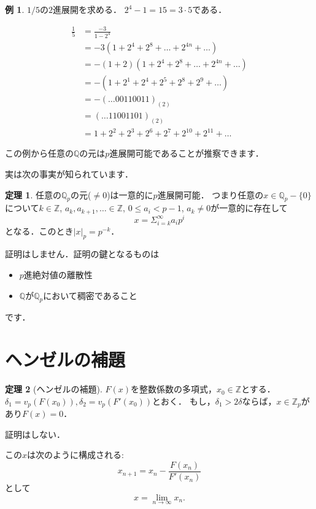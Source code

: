\documentclass[uplatex]{jsarticle}
\newcommand{\Z}{\mathbb{Z}}
\newcommand{\Q}{\mathbb{Q}}
\theoremstyle{definition} %
\newtheorem{thm}{定理}
\newtheorem*{example*}{例}
\begin{document}
\begin{example*}
$1/5$の$2$進展開を求める．
$2^4-1 = 15 = 3 \cdot 5$である．

\begin{align*}
\frac{1}{5} &= \frac{-3}{1-2^4} \\
&= -3 (1 + 2^4 + 2^8 + \dots+ 2^{4n} + \dots) \\
&= -(1+2) (1 + 2^4 + 2^8 + \dots+ 2^{4n} + \dots) \\
&= -(1 + 2^1 + 2^4 + 2^5 + 2^8 + 2^9 + \dots) \\
&= -(\dots 00110011)_{(2)} \\
&= (\dots 11001101)_{(2)} \\
&= 1 + 2^2 + 2^3 + 2^6 + 2^7 + 2^{10} + 2^{11} + \dots
\end{align*}
\end{example*}

この例から任意の$\Q$の元は$p$進展開可能であることが推察できます．

実は次の事実が知られています．
\begin{oframed}\begin{thm}
任意の$\Q_p$の元($\ne 0$)は一意的に$p$進展開可能．
つまり任意の$x \in \Q_p- \{0\}$について$k \in \Z$, $a_k, a_{k+1}, \dots \in \Z$, $0 \le a_i < p-1$, $a_k \ne 0$が一意的に存在して
\[x = \Sigma_{i=k}^\infty a_i p^i\]
となる．このとき$|x|_p = p^{-k}$．
\end{thm}\end{oframed}
証明はしません．証明の鍵となるものは
\begin{itemize}
\item $p$進絶対値の離散性
\item $\Q$が$\Q_p$において稠密であること
\end{itemize}
です．

\section{ヘンゼルの補題}

\begin{oframed}\begin{thm}[ヘンゼルの補題]
$F(x)$を整数係数の多項式，$x_0 \in \Z$とする．
$\delta_1 = v_p(F(x_0)), \delta_2 = v_p(F'(x_0))$とおく．
もし，$\delta_1 > 2 \delta$ならば，$x \in \Z_p$があり$F(x)=0$．
\end{thm}\end{oframed}
証明はしない．

この$x$は次のように構成される:
\[x_{n+1} = x_n - \frac{F(x_n)}{F'(x_n)}\]
として
\[x = \lim_{n\to\infty}x_n.\]
\end{document}
